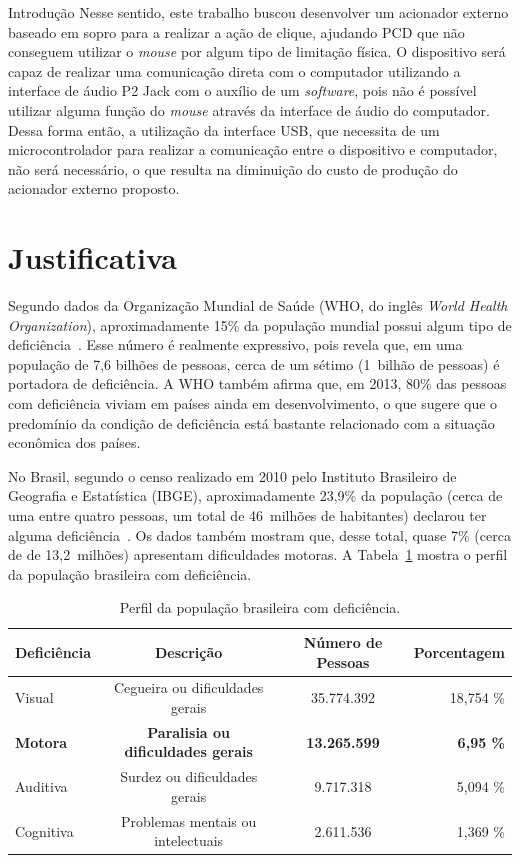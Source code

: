 \begin{chapter}{Introdução}
Nesse sentido, este trabalho buscou desenvolver um acionador externo baseado em
sopro para a realizar a ação de clique, ajudando PCD que não conseguem utilizar
o \textit{mouse} por algum tipo de limitação física. O dispositivo será capaz de
realizar uma comunicação direta com o computador utilizando a interface de
áudio P2 Jack com o auxílio de um \textit{software}, pois não é possível 
utilizar alguma função do \textit{mouse} através da interface de áudio do
computador. Dessa forma então, a utilização da interface USB, que necessita de
um microcontrolador para realizar a comunicação entre o dispositivo e
computador, não será necessário, o que resulta na diminuição do custo de
produção do acionador externo proposto. 


\section{Justificativa}

Segundo dados da Organização Mundial de Saúde (WHO, do inglês \textit{World
Health Organization}), aproximadamente 15\% da população mundial possui algum
tipo de deficiência~\cite{WHO15}. Esse número é realmente expressivo, pois
revela que, em uma população de 7,6 bilhões de pessoas, cerca de um sétimo
(1~bilhão de pessoas) é portadora de deficiência. A WHO também afirma que, em
2013, 80\% das pessoas com deficiência viviam em países ainda em
desenvolvimento, o que sugere que o predomínio da condição de deficiência está
bastante relacionado com a situação econômica dos países.

No Brasil, segundo o censo realizado em 2010 pelo Instituto Brasileiro de
Geografia e Estatística (IBGE), aproximadamente 23,9\% da população (cerca de
uma entre quatro pessoas, um total de 46~milhões de habitantes) declarou ter
alguma deficiência~\cite{tIBGE}. Os dados também mostram que, desse total, quase
7\% (cerca de de 13,2~milhões) apresentam dificuldades motoras. A
Tabela~\ref{tab:ibge} mostra o perfil da população brasileira com deficiência.

\begin{table}[!h]
\centering
\caption{Perfil da população brasileira com deficiência.}
\label{tab:ibge}
\def\arraystretch{1.25}
\begin{tabular}{lccr}
	\hline
	\hline
	\textbf{Deficiência} & \textbf{Descrição} & \textbf{Número de Pessoas} &
\textbf{Porcentagem} \\
	\hline
	Visual    & Cegueira ou dificuldades gerais   & 35.774.392  & 18,754 \%  \\
	\textbf{Motora}    & \textbf{Paralisia ou dificuldades gerais}  & \textbf{13.265.599}  & \textbf{6,95 \%} \\
	Auditiva  & Surdez ou dificuldades gerais     & 9.717.318   &  5,094 \%  \\
	Cognitiva & Problemas mentais ou intelectuais & 2.611.536   &  1,369 \%  \\ 
	\hline
	\hline
\end{tabular}
\end{table} %


\end{chapter}
